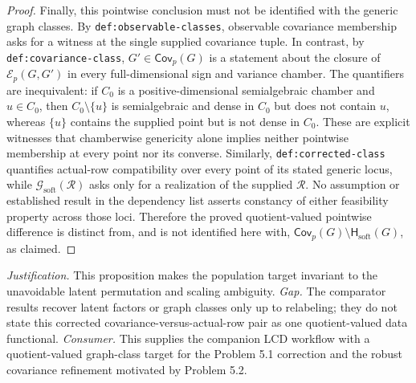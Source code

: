 \documentclass{article}
\begin{document}
\begin{proof}
Finally, this pointwise conclusion must not be identified with the generic graph
classes.  By \texttt{def:observable-classes}, observable covariance membership
asks for a witness at the single supplied covariance tuple.  In contrast, by
\texttt{def:covariance-class}, \(G'\in\mathsf{Cov}_p(G)\) is a statement about
the closure of \(\mathcal E_p(G,G')\) in every full-dimensional sign and variance
chamber.  The quantifiers are inequivalent: if \(C_0\) is a positive-dimensional
semialgebraic chamber and \(u\in C_0\), then
\(C_0\setminus\{u\}\) is semialgebraic and dense in \(C_0\) but does not contain
\(u\), whereas \(\{u\}\) contains the supplied point but is not dense in
\(C_0\).  These are explicit witnesses that chamberwise genericity alone implies
neither pointwise membership at every point nor its converse.  Similarly,
\texttt{def:corrected-class} quantifies actual-row compatibility over every point
of its stated generic locus, while \(\mathcal G_{\mathrm{soft}}(\mathcal R)\)
asks only for a realization of the supplied \(\mathcal R\).  No assumption or
established result in the dependency list asserts constancy of either feasibility
property across those loci.  Therefore the proved quotient-valued pointwise
difference is distinct from, and is not identified here with,
\(\mathsf{Cov}_p(G)\setminus\mathsf H_{\mathrm{soft}}(G)\), as claimed.
\end{proof}
\par\smallskip\noindent \textit{Justification.} This proposition makes the population target invariant to the unavoidable latent permutation and scaling ambiguity. \textit{Gap.} The comparator results recover latent factors or graph classes only up to relabeling; they do not state this corrected covariance-versus-actual-row pair as one quotient-valued data functional. \textit{Consumer.} This supplies the companion LCD workflow with a quotient-valued graph-class target for the Problem 5.1 correction and the robust covariance refinement motivated by Problem 5.2.
\end{document}

